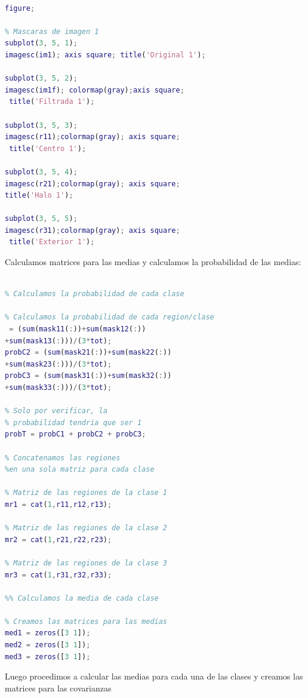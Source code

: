 \documentclass[10pt,journal,compsoc]{IEEEtran}\usepackage[T1]{fontenc}                              %
\begin{document}
\begin{lstlisting}[language=Matlab,basicstyle=\small]
% Desplegamos imagenes filtradas

figure;

% Mascaras de imagen 1
subplot(3, 5, 1);
imagesc(im1); axis square; title('Original 1');

subplot(3, 5, 2);
imagesc(im1f); colormap(gray);axis square;
 title('Filtrada 1');

subplot(3, 5, 3);
imagesc(r11);colormap(gray); axis square;
 title('Centro 1');

subplot(3, 5, 4);
imagesc(r21);colormap(gray); axis square; 
title('Halo 1');

subplot(3, 5, 5);
imagesc(r31);colormap(gray); axis square;
 title('Exterior 1');

\end{lstlisting}


Calculamos matrices para las medias y calculamos la probabilidad de las medias:

\begin{lstlisting}[language=Matlab, basicstyle=\small]

% Calculamos la probabilidad de cada clase

% Calculamos la probabilidad de cada region/clase
 = (sum(mask11(:))+sum(mask12(:))
+sum(mask13(:)))/(3*tot);
probC2 = (sum(mask21(:))+sum(mask22(:))
+sum(mask23(:)))/(3*tot);
probC3 = (sum(mask31(:))+sum(mask32(:))
+sum(mask33(:)))/(3*tot);

% Solo por verificar, la
% probabilidad tendria que ser 1
probT = probC1 + probC2 + probC3;

% Concatenamos las regiones 
%en una sola matriz para cada clase

% Matriz de las regiones de la clase 1
mr1 = cat(1,r11,r12,r13);

% Matriz de las regiones de la clase 2
mr2 = cat(1,r21,r22,r23);

% Matriz de las regiones de la clase 3
mr3 = cat(1,r31,r32,r33);

%% Calculamos la media de cada clase

% Creamos las matrices para las medias
med1 = zeros([3 1]);
med2 = zeros([3 1]);
med3 = zeros([3 1]);

\end{lstlisting}


Luego procedimos a calcular las medias para cada una de las clases y creamos las matrices para las covarianzas
\end{document}
